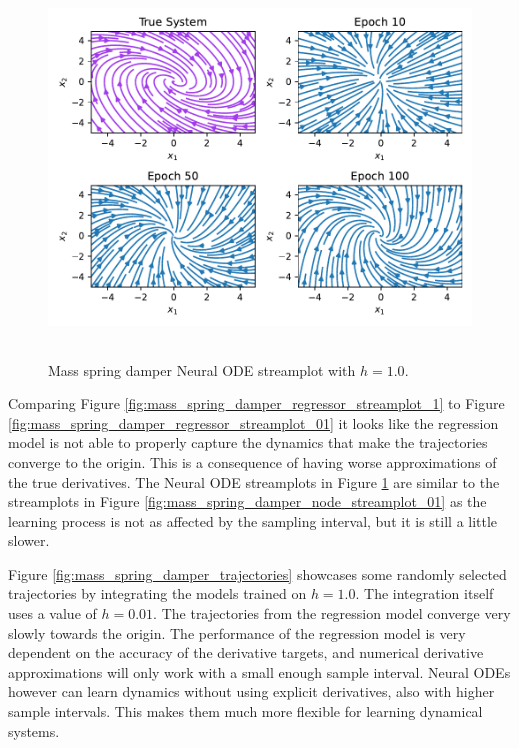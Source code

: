 \documentclass[12pt,a4paper]{book}
\begin{document}
\begin{figure}[H]
    \centering
    \includegraphics[height=10cm]{figs/plots/basic_experiments/mass_spring_damper_node_streamplot_1.pdf}
    \caption{Mass spring damper Neural ODE streamplot with $h = 1.0$.}
    \label{fig:mass_spring_damper_node_streamplot_1}
\end{figure}

Comparing Figure \ref{fig:mass_spring_damper_regressor_streamplot_1} to Figure \ref{fig:mass_spring_damper_regressor_streamplot_01} it looks like the regression model is not able to properly capture the dynamics that make the trajectories converge to the origin. This is a consequence of having worse approximations of the true derivatives. The Neural ODE streamplots in Figure \ref{fig:mass_spring_damper_node_streamplot_1} are similar to the streamplots in Figure \ref{fig:mass_spring_damper_node_streamplot_01} as the learning process is not as affected by the sampling interval, but it is still a little slower.

Figure \ref{fig:mass_spring_damper_trajectories} showcases some randomly selected trajectories by integrating the models trained on $h = 1.0$. The integration itself uses a value of $h=0.01$. The trajectories from the regression model converge very slowly towards the origin. The performance of the regression model is very dependent on the accuracy of the derivative targets, and numerical derivative approximations will only work with a small enough sample interval. Neural ODEs however can learn dynamics without using explicit derivatives, also with higher sample intervals. This makes them much more flexible for learning dynamical systems.
\end{document}
